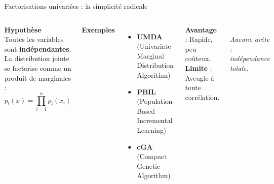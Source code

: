\documentclass[10pt,aspectratio=169]{beamer}
\begin{document}
\begin{frame}{Factorisations univariées : la simplicité radicale}
\begin{columns}[T]
\textbf{Hypothèse}\\[0.1cm]
Toutes les variables sont \textbf{indépendantes}. La distribution jointe se factorise comme un produit de marginales :
\[
p_l(x) = \prod_{i=1}^{n} p_l(x_i)
\]

\vspace{0.2cm}
\textbf{Exemples}\\[0.1cm]
\begin{itemize}
  \item \textbf{UMDA} (Univariate Marginal Distribution Algorithm)
  \item \textbf{PBIL} (Population-Based Incremental Learning)
  \item \textbf{cGA} (Compact Genetic Algorithm)
\end{itemize}

\vspace{0.2cm}
\textbf{Avantage} : Rapide, peu coûteux.\\
\textbf{Limite} : Aveugle à toute corrélation.

\centering
{}\\[0.3cm]
\footnotesize\textit{Aucune arête : indépendance totale.}
\end{columns}
\end{frame}
\end{document}
